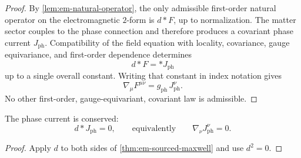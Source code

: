 \begin{proof}
	By \cref{lem:em-natural-operator}, the only admissible first-order
	natural operator on the electromagnetic \(2\)-form is \(d{*}F\), up to
	normalization.
	The matter sector couples to the phase connection and therefore
	produces a covariant phase current \(J_{\mathrm{ph}}\).
	Compatibility of the field equation with locality, covariance, gauge
	equivariance, and first-order dependence determines
	\[
		d{*}F = {*}J_{\mathrm{ph}}
	\]
	up to a single overall constant.
	Writing that constant in index notation gives
	\[
		\nabla_\mu F^{\mu\nu}=g_{\mathrm{ph}}\,J_{\mathrm{ph}}^\nu.
	\]
	No other first-order, gauge-equivariant, covariant law is admissible.
\end{proof}
\begin{corollary}
	The phase current is conserved:
	\[
		d{*}J_{\mathrm{ph}}=0,
		\qquad\text{equivalently}\qquad
		\nabla_\nu J_{\mathrm{ph}}^\nu=0.
	\]
\end{corollary}
\begin{proof}
	Apply \(d\) to both sides of \cref{thm:em-sourced-maxwell} and use
	\(d^2=0\).
\end{proof}
